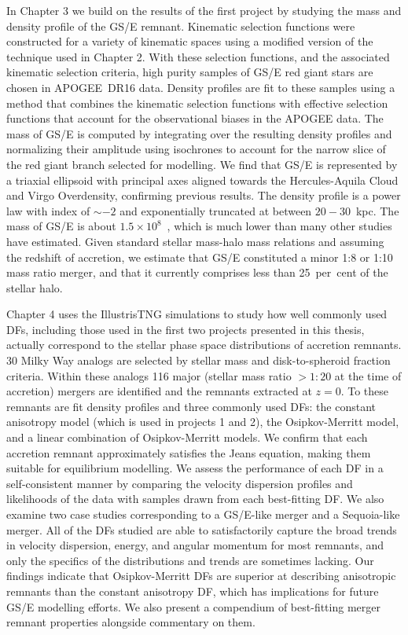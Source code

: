 In Chapter 3 we build on the results of the first project by studying the mass and density profile of the GS/E remnant. Kinematic selection functions were constructed for a variety of kinematic spaces using a modified version of the technique used in Chapter 2. With these selection functions, and the associated kinematic selection criteria, high purity samples of GS/E red giant stars are chosen in APOGEE~DR16 data. Density profiles are fit to these samples using a method that combines the kinematic selection functions with effective selection functions that account for the observational biases in the APOGEE data. The mass of GS/E is computed by integrating over the resulting density profiles and normalizing their amplitude using isochrones to account for the narrow slice of the red giant branch selected for modelling. We find that GS/E is represented by a triaxial ellipsoid with principal axes aligned towards the Hercules-Aquila Cloud and Virgo Overdensity, confirming previous results. The density profile is a power law with index of $\sim -2$ and exponentially truncated at between $20-30$~kpc. The mass of GS/E is about $1.5\times10^{8}$~\Msun, which is much lower than many other studies have estimated. Given standard stellar mass-halo mass relations and assuming the redshift of accretion, we estimate that GS/E constituted a minor 1:8 or 1:10 mass ratio merger, and that it currently comprises less than 25~per~cent of the stellar halo.

Chapter 4 uses the IllustrisTNG simulations to study how well commonly used DFs, including those used in the first two projects presented in this thesis, actually correspond to the stellar phase space distributions of accretion remnants. 30 Milky Way analogs are selected by stellar mass and disk-to-spheroid fraction criteria. Within these analogs 116 major (stellar mass ratio $> 1:20$ at the time of accretion) mergers are identified and the remnants extracted at $z=0$. To these remnants are fit density profiles and three commonly used DFs: the constant anisotropy model (which is used in projects 1 and 2), the Osipkov-Merritt model, and a linear combination of Osipkov-Merritt models. We confirm that each accretion remnant approximately satisfies the Jeans equation, making them suitable for equilibrium modelling. We assess the performance of each DF in a self-consistent manner by comparing the velocity dispersion profiles and likelihoods of the data with samples drawn from each best-fitting DF. We also examine two case studies corresponding to a GS/E-like merger and a Sequoia-like merger. All of the DFs studied are able to satisfactorily capture the broad trends in velocity dispersion, energy, and angular momentum for most remnants, and only the specifics of the distributions and trends are sometimes lacking. Our findings indicate that Osipkov-Merritt DFs are superior at describing anisotropic remnants than the constant anisotropy DF, which has implications for future GS/E modelling efforts. We also present a compendium of best-fitting merger remnant properties alongside commentary on them.